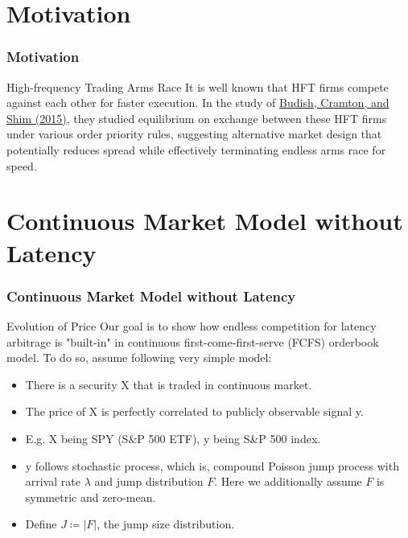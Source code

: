 \documentclass{beamer}
\begin{document}
\section{Motivation}

\begin{frame}
    \frametitle{Motivation}
    \begin{block}{High-frequency Trading Arms Race}
        It is well known that HFT firms compete against each other for faster execution. In the study of \href{https://academic.oup.com/qje/article/130/4/1547/1916146}{Budish, Cramton, and Shim (2015)}, they studied equilibrium on exchange between these HFT firms under various order priority rules, suggesting alternative market design that potentially reduces spread while effectively terminating endless arms race for speed.
    \end{block}
\end{frame}

\section{Continuous Market Model without Latency}

\begin{frame}
    \frametitle{Continuous Market Model without Latency} 
    \begin{block}{Evolution of Price}
        Our goal is to show how endless competition for latency arbitrage is "built-in" in continuous first-come-first-serve (FCFS) orderbook model. To do so, assume following very simple model:
        \begin{itemize}
            \item There is a security X that is traded in continuous market.
            \item The price of X is perfectly correlated to publicly observable signal y.
            \item E.g. X being SPY (S\&P 500 ETF), y being S\&P 500 index.
            \item y follows stochastic process, which is, compound Poisson jump process with arrival rate $\lambda$ and jump distribution $F$. Here we additionally assume $F$ is symmetric and zero-mean.
            \item Define $J \coloneq |F|$, the jump size distribution. 
        \end{itemize}
    \end{block}
\end{frame}
\end{document}
